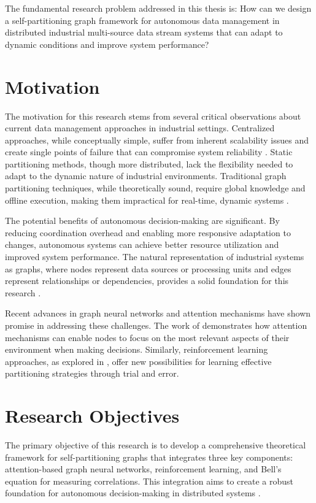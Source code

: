 The fundamental research problem addressed in this thesis is: How can we design a self-partitioning graph framework for autonomous data management in distributed industrial multi-source data stream systems that can adapt to dynamic conditions and improve system performance?

\section{Motivation}
The motivation for this research stems from several critical observations about current data management approaches in industrial settings. Centralized approaches, while conceptually simple, suffer from inherent scalability issues and create single points of failure that can compromise system reliability \cite{case2023}. Static partitioning methods, though more distributed, lack the flexibility needed to adapt to the dynamic nature of industrial environments. Traditional graph partitioning techniques, while theoretically sound, require global knowledge and offline execution, making them impractical for real-time, dynamic systems \cite{karypis1998fast}.

The potential benefits of autonomous decision-making are significant. By reducing coordination overhead and enabling more responsive adaptation to changes, autonomous systems can achieve better resource utilization and improved system performance. The natural representation of industrial systems as graphs, where nodes represent data sources or processing units and edges represent relationships or dependencies, provides a solid foundation for this research \cite{gnn2023}.

Recent advances in graph neural networks and attention mechanisms have shown promise in addressing these challenges. The work of \cite{attention2023} demonstrates how attention mechanisms can enable nodes to focus on the most relevant aspects of their environment when making decisions. Similarly, reinforcement learning approaches, as explored in \cite{rl2023}, offer new possibilities for learning effective partitioning strategies through trial and error.

\section{Research Objectives}
The primary objective of this research is to develop a comprehensive theoretical framework for self-partitioning graphs that integrates three key components: attention-based graph neural networks, reinforcement learning, and Bell's equation for measuring correlations. This integration aims to create a robust foundation for autonomous decision-making in distributed systems \cite{bell2023}.

